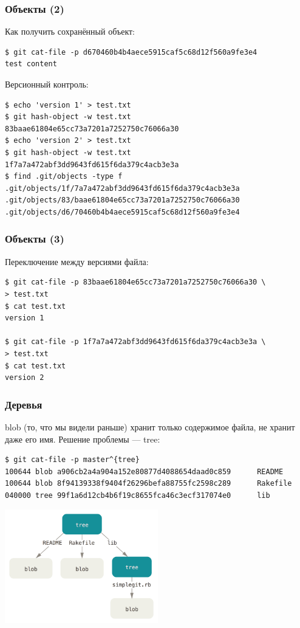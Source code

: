 \documentclass{../mcsslides}
\begin{document}
    \begin{frame}[fragile]
        \frametitle{Объекты (2)}
        Как получить сохранённый объект:
        \begin{verbatim}
$ git cat-file -p d670460b4b4aece5915caf5c68d12f560a9fe3e4
test content
        \end{verbatim}

        Версионный контроль:
        \begin{verbatim}
$ echo 'version 1' > test.txt
$ git hash-object -w test.txt
83baae61804e65cc73a7201a7252750c76066a30
$ echo 'version 2' > test.txt
$ git hash-object -w test.txt
1f7a7a472abf3dd9643fd615f6da379c4acb3e3a
$ find .git/objects -type f
.git/objects/1f/7a7a472abf3dd9643fd615f6da379c4acb3e3a
.git/objects/83/baae61804e65cc73a7201a7252750c76066a30
.git/objects/d6/70460b4b4aece5915caf5c68d12f560a9fe3e4
        \end{verbatim}
    \end{frame}

    \begin{frame}[fragile]
        \frametitle{Объекты (3)}
        Переключение между версиями файла:
        \begin{verbatim}
$ git cat-file -p 83baae61804e65cc73a7201a7252750c76066a30 \
> test.txt
$ cat test.txt
version 1

$ git cat-file -p 1f7a7a472abf3dd9643fd615f6da379c4acb3e3a \
> test.txt
$ cat test.txt
version 2
        \end{verbatim}
    \end{frame}

    \begin{frame}[fragile]
        \frametitle{Деревья}
        blob (то, что мы видели раньше) хранит только содержимое файла, не хранит даже его имя. Решение проблемы --- tree:
        \begin{scriptsize}
        \begin{verbatim}
$ git cat-file -p master^{tree}
100644 blob a906cb2a4a904a152e80877d4088654daad0c859      README
100644 blob 8f94139338f9404f26296befa88755fc2598c289      Rakefile
040000 tree 99f1a6d12cb4b6f19c8655fca46c3ecf317074e0      lib
        \end{verbatim}
        \end{scriptsize}
        \begin{center}
            \includegraphics[width=0.5\textwidth]{gitTreeObject.png}
        \end{center}
    \end{frame}
\end{document}
